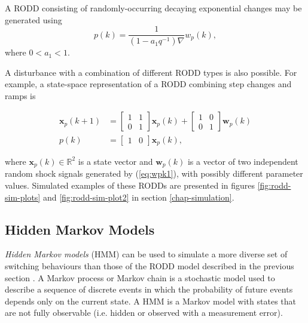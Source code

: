 A RODD consisting of randomly-occurring decaying exponential changes may be generated using
\begin{equation} \label{eq:RODD-exp}
	p(k)= \frac{1}{(1-a_1q^{-1})\nabla}w_p(k),
\end{equation}
where  $0<a_1<1$.

A disturbance with a combination of different RODD types is also possible.  For example, a state-space representation of a RODD combining step changes and ramps is

\begin{equation} \label{eq:RODD-step-ramp}
	\begin{split}
		\mathbf{x}_p(k+1) & =\left[\begin{array}{cc}
			1 & 1 \\
			0 & 1
		\end{array}\right] \mathbf{x}_p(k) +\left[\begin{array}{cc}
			1 & 0 \\
			0 & 1
		\end{array}\right] \mathbf{w}_p(k) \\
		p(k) & =\left[\begin{array}{cc}
			1 & 0
		\end{array}\right] \mathbf{x}_p(k),
	\end{split}
\end{equation}

where $\mathbf{x}_p(k) \in \mathbb{R}^2$ is a state vector and $\mathbf{w}_p(k)$ is a vector of two independent random shock signals generated by (\ref{eq:wpk1}), with possibly different parameter values. Simulated examples of these RODDs are presented in figures \ref{fig:rodd-sim-plots} and \ref{fig:rodd-sim-plot2} in section \ref{chap-simulation}.

\subsection{Hidden Markov Models}

\textit{Hidden Markov models} (HMM) can be used to simulate a more diverse set of switching behaviours than those of the RODD model described in the previous section \citep{wong_realistic_2009}. A Markov process or Markov chain is a stochastic model used to describe a sequence of discrete events in which the probability of future events depends only on the current state. A HMM is a Markov model with states that are not fully observable (i.e. hidden or observed with a measurement error).

